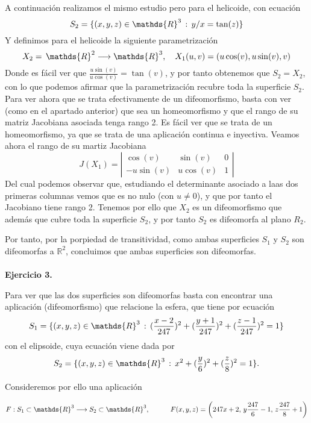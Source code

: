 \documentclass[fleqn]{article}
\def\R{\mathds{R}}
\begin{document}
        A continuación realizamos el mismo estudio pero para el helicoide, con ecuación 
        $$S_2 = \{(x,y,z) \in \R^3 \thinspace : \thinspace y/x = \tan(z)\}$$
        Y definimos para el helicoide la siguiente parametrización
        $$X_2 = \thinspace \R^2 \longrightarrow \R^3, \quad X_1(u,v) = (u \cos(v), u \sin (v), v)$$
        Donde es fácil ver que $\frac{u \sin(v)}{u \cos (v)} = \tan (v)$, y por tanto obtenemos que $S_2 = X_2$, con lo que podemos afirmar que la 
        parametrización recubre toda la superficie $S_2$. Para ver ahora que se trata efectivamente de un difeomorfismo, basta con ver (como en el 
        apartado anterior) que sea un homeomorfismo y que el rango de su matriz Jacobiana asociada tenga rango 2. Es fácil ver que se trata de un
        homeomorfismo, ya que se trata de una aplicación continua e inyectiva. Veamos ahora el rango de su martiz Jacobiana
        $$J(X_1)= \left|
                \begin{matrix}
                        \cos(v) & \sin(v) & 0 \\
                        -u\sin(v) & u\cos(v) & 1
                \end{matrix}
        \right|$$
        Del cual podemos observar que, estudiando el determinante asociado a laas dos primeras columnas vemos que es no nulo (con $u\neq 0$), 
        y que por tanto el Jacobiano tiene rango 2. Tenemos por ello que $X_2$ es un difeomorfismo que además que cubre toda la superficie $S_2$, y por tanto
        $S_2$ es difeomorfa al plano $R_2$. 

        Por tanto, por la porpiedad de transitividad, como ambas superficies $S_1$ y $S_2$ son difeomorfas a $\R^2$, concluimos que ambas superficies
        son difeomorfas.\\ \\

        \textbf{Ejercicio 3. }
        
        Para ver que las dos superficies son difeomorfas basta con encontrar una aplicación (difeomorfismo) que relacione la esfera, que tiene por 
        ecuación 
        $$S_1 = \{(x,y,z)\in \R^3\thinspace : \thinspace (\frac{x-2}{247})^2 + (\frac{y+1}{247})^2 + (\frac{z-1}{247})^2 = 1\}$$
        con el elipsoide, cuya ecuación viene dada por 
        $$S_2 = \{(x,y,z)\in \R^3\thinspace : \thinspace x^2 + (\frac{y}{6})^2 + (\frac{z}{8})^2 = 1\}.$$

        Consideremos por ello una aplicación 

                $$F: S_1\subset \R^3 \longrightarrow S_2\subset \R^3 , \quad \quad \quad
                F(x,y,z)=\left(247x + 2, \thinspace y\frac{247}{6}-1, \thinspace z\frac{247}{8} + 1\right)$$
\end{document}
